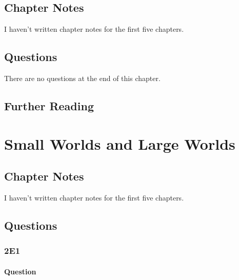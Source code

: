 \documentclass[
]{book}
\begin{document}
\hypertarget{chapter-notes}{%
\section{Chapter Notes}\label{chapter-notes}}

I haven't written chapter notes for the first five chapters.

\hypertarget{questions}{%
\section{Questions}\label{questions}}

There are no questions at the end of this chapter.

\hypertarget{further-reading}{%
\section*{Further Reading}\label{further-reading}}

\hypertarget{small_worlds}{%
\chapter{Small Worlds and Large Worlds}\label{small_worlds}}

\hypertarget{chapter-notes-1}{%
\section{Chapter Notes}\label{chapter-notes-1}}

I haven't written chapter notes for the first five chapters.

\hypertarget{questions-1}{%
\section{Questions}\label{questions-1}}

\hypertarget{e1}{%
\subsection*{2E1}\label{e1}}

\hypertarget{question}{%
\subsubsection*{Question}\label{question}}
\end{document}
